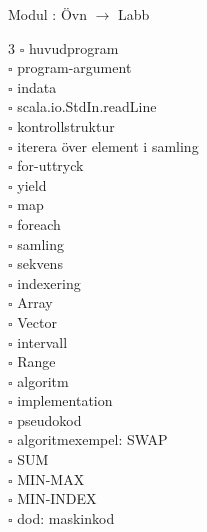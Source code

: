
    Modul : Övn  $\rightarrow$ Labb 
    \begin{multicols}{3}\SlideFontTiny
    $\square$ huvudprogram \\
$\square$ program-argument \\
$\square$ indata \\
$\square$ scala.io.StdIn.readLine \\
$\square$ kontrollstruktur \\
$\square$ iterera över element i samling \\
$\square$ for-uttryck \\
$\square$ yield \\
$\square$ map \\
$\square$ foreach \\
$\square$ samling \\
$\square$ sekvens \\
$\square$ indexering \\
$\square$ Array \\
$\square$ Vector \\
$\square$ intervall \\
$\square$ Range \\
$\square$ algoritm \\
$\square$ implementation \\
$\square$ pseudokod \\
$\square$ algoritmexempel: SWAP \\
$\square$ SUM \\
$\square$ MIN-MAX \\
$\square$ MIN-INDEX \\
$\square$ dod: maskinkod \\
    \end{multicols}
    